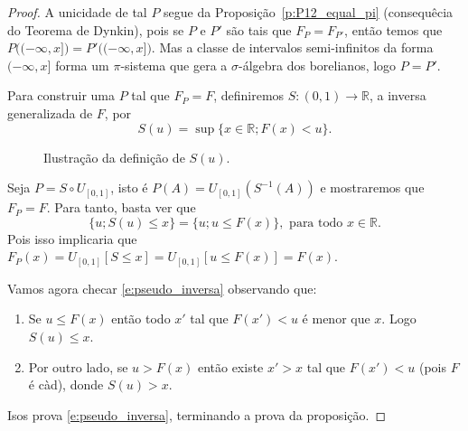 \documentclass[reqno, draft]{book}
\newcommand*\1{\mathds{1}}
\begin{document}
\begin{proof}
  A unicidade de tal $P$ segue da Proposição~\ref{p:P12_equal_pi} (consequêcia do Teorema de Dynkin), pois se $P$ e $P'$ são tais que $F_{P} = F_{P'}$, então temos que $P\big( (-\infty, x] \big) = P'\big( (-\infty, x] \big)$.
  Mas a classe de intervalos semi-infinitos da forma $(-\infty, x]$ forma um $\pi$-sistema que gera a $\sigma$-álgebra dos borelianos, logo $P = P'$.

  Para construir uma $P$ tal que $F_P = F$, definiremos $S:(0,1) \to \mathbb{R}$, a inversa generalizada de $F$, por
  \begin{equation}
    S(u) = \sup \{x \in \mathbb{R}; F(x) < u\}.
  \end{equation}
  \begin{figure}[htbp]
    \centering
    \caption{\small Ilustração da definição de $S(u)$.}
    \label{f:Rk_good}
  \end{figure}

  Seja $P = S \circ U_{[0,1]}$, isto é $P(A) = U_{[0,1]}(S^{-1}(A))$ e mostraremos que $F_P = F$.
  Para tanto, basta ver que
  \begin{equation}
    \label{e:pseudo_inversa}
    \{u; S(u) \leq x\} = \{u; u \leq F(x)\}, \text{ para todo $x \in \mathbb{R}$}.
  \end{equation}
  Pois isso implicaria que $F_P(x) = U_{[0,1]}[S \leq x] = U_{[0,1]} [u \leq F(x)] = F(x)$.

  Vamos agora checar \eqref{e:pseudo_inversa} observando que:
  \begin{enumerate}[\quad a)]
  \item Se $u \leq F(x)$ então todo $x'$ tal que $F(x') < u$ é menor que $x$.
    Logo $S(u) \leq x$.
  \item Por outro lado, se $u > F(x)$ então existe $x' > x$ tal que $F(x') < u$ (pois $F$ é càd), donde $S(u) > x$.
  \end{enumerate}
  Isos prova \eqref{e:pseudo_inversa}, terminando a prova da proposição.
\end{proof}
\end{document}
